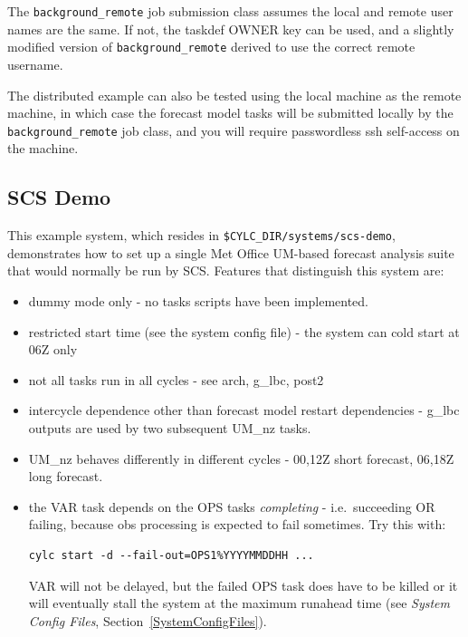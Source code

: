 \documentclass[11pt,a4paper]{article}
\begin{document}
The \lstinline=background_remote= job submission class assumes the local
and remote user names are the same.  If not, the taskdef OWNER key can
be used, and a slightly modified version of
\lstinline=background_remote= derived to use the correct remote
username.

The distributed example can also be tested using the local machine as
the remote machine, in which case the forecast model tasks will be
submitted locally by the \lstinline=background_remote= job class, and
you will require passwordless ssh self-access on the machine.


\subsection{SCS Demo}

This example system, which resides in 
\lstinline=$CYLC_DIR/systems/scs-demo=,
demonstrates how to set up a single Met Office
UM-based forecast analysis suite that would normally be run by SCS.
Features that distinguish this system are:

\begin{itemize}

    \item dummy mode only - no tasks scripts have been implemented.

    \item restricted start time (see the system config file) - the
        system can cold start at 06Z only

    \item not all tasks run in all cycles - see arch, g\_lbc, post2

    \item intercycle dependence other than forecast model restart 
        dependencies - g\_lbc outputs are used by two subsequent UM\_nz
        tasks.

    \item UM\_nz behaves differently in different cycles - 00,12Z short
        forecast, 06,18Z long forecast.

    \item the VAR task depends on the OPS tasks {\em completing} - i.e.\
        succeeding OR failing, because obs processing is expected to
        fail sometimes.  Try this with:

        \begin{lstlisting}
cylc start -d --fail-out=OPS1%YYYYMMDDHH ...
        \end{lstlisting}

        VAR will not be delayed, but the failed OPS task does have to be
        killed or it will eventually stall the system at the maximum
        runahead time (see {\em System Config Files},
        Section~\ref{SystemConfigFiles}).
        
\end{itemize}
\end{document}
